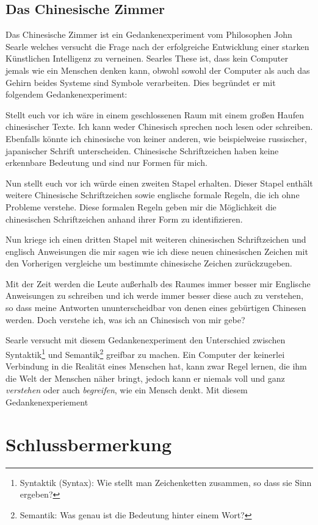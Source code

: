 \documentclass[12pt,german,ngerman]{report}
\begin{document}
    \section{Das Chinesische Zimmer}
    Das Chinesische Zimmer ist ein Gedankenexperiment vom Philosophen John Searle welches
    versucht die Frage nach der erfolgreiche Entwicklung einer starken Künstlichen Intelligenz zu verneinen.
    Searles These ist, dass kein Computer jemals wie ein Menschen denken kann,
    obwohl sowohl der Computer als auch das Gehirn beides Systeme sind Symbole verarbeiten.\cite{nimtz2013chinesische}
    Dies begründet er mit folgendem Gedankenexperiment:
    \begin{displayquote}
        Stellt euch vor ich wäre in einem geschlossenen Raum mit einem großen Haufen chinesischer Texte.
        Ich kann weder Chinesisch sprechen noch lesen oder schreiben.
        Ebenfalls könnte ich chinesische von keiner anderen, wie beispielweise russischer, japanischer Schrift unterscheiden.
        Chinesische Schriftzeichen haben keine erkennbare Bedeutung und sind nur Formen für mich.

        Nun stellt euch vor ich würde einen zweiten Stapel erhalten. Dieser Stapel enthält weitere
        Chinesische Schriftzeichen sowie englische formale Regeln, die ich ohne Probleme verstehe.
        Diese formalen Regeln geben mir die Möglichkeit die chinesischen Schriftzeichen
        anhand ihrer Form zu identifizieren.

        Nun kriege ich einen dritten Stapel mit weiteren chinesischen Schriftzeichen und englisch Anweisungen die mir sagen wie ich
        diese neuen chinesischen Zeichen mit den Vorherigen vergleiche um bestimmte chinesische Zeichen zurückzugeben.

        Mit der Zeit werden die Leute außerhalb des Raumes immer besser mir Englische Anweisungen zu schreiben und
        ich werde immer besser diese auch zu verstehen, so dass meine Antworten ununterscheidbar von denen eines
        gebürtigen Chinesen werden. Doch verstehe ich, was ich an Chinesisch von mir gebe?
        \autocite[1]{searle1999chinese}
    \end{displayquote}
    Searle versucht mit diesem Gedankenexperiment den Unterschied zwischen
    Syntaktik\footnote{Syntaktik (Syntax): Wie stellt man Zeichenketten zusammen, so dass sie Sinn ergeben?}
    und Semantik\footnote{Semantik: Was genau ist die Bedeutung hinter einem Wort?}
    greifbar zu machen.
    Ein Computer der keinerlei Verbindung in die Realität eines Menschen hat, kann zwar Regel lernen, die ihm die
    Welt der Menschen näher bringt, jedoch kann er niemals voll und ganz \emph{verstehen} oder auch \emph{begreifen},
    wie ein Mensch denkt. Mit diesem Gedankenexperiement

    \chapter{Schlussbermerkung}

    \printbibliography
\end{document}
